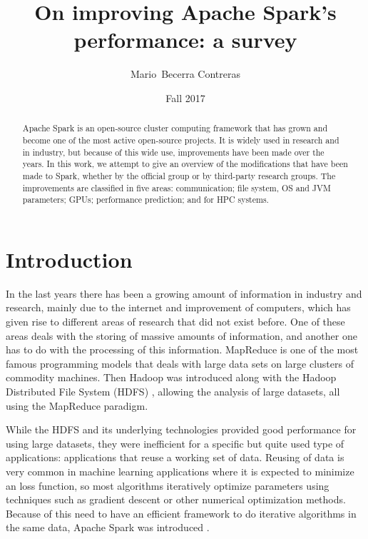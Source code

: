 \documentclass{article}
\begin{document}

\title{On improving Apache Spark's performance: a survey}

\author{Mario~Becerra Contreras}

\date{Fall 2017}


\maketitle

\begin{abstract}

Apache Spark is an open-source cluster computing framework that has grown and become one of the most active open-source projects. It is widely used in research and in industry, but because of this wide use, improvements have been made over the years. In this work, we attempt to give an overview of the modifications that have been made to Spark, whether by the official group or by third-party research groups. The improvements are classified in five areas: communication; file system, OS and JVM parameters; GPUs; performance prediction; and for HPC systems.

\end{abstract}

\section{Introduction}

In the last years there has been a growing amount of information in industry and research, mainly due to the internet and improvement of computers, which has given rise to different areas of research that did not exist before. One of these areas deals with the storing of massive amounts of information, and another one has to do with the processing of this information. MapReduce \cite{dean2008mapreduce} is one of the most famous programming models that deals with large data sets on large clusters of commodity machines. Then Hadoop was introduced along with the Hadoop Distributed File System (HDFS) \cite{Shvachko2010}, allowing the analysis of large datasets, all using the MapReduce paradigm.

While the HDFS and its underlying technologies provided good performance for using large datasets, they were inefficient for a specific but quite used type of applications: applications that reuse a working set of data. Reusing of data is very common in machine learning applications where it is expected to minimize an loss function, so most algorithms iteratively optimize parameters using techniques such as gradient descent or other numerical optimization methods. Because of this need to have an efficient framework to do iterative algorithms in the same data, Apache Spark was introduced \cite{zaharia_resilient_2012} \cite{zaharia_spark:_2010}.
\end{document}
